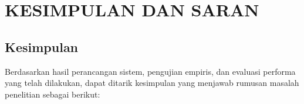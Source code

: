 \chapter{KESIMPULAN DAN SARAN}

\section{Kesimpulan}
\label{sec:conclusion}

Berdasarkan hasil perancangan sistem, pengujian empiris, dan evaluasi performa yang telah dilakukan, dapat ditarik kesimpulan yang menjawab rumusan masalah penelitian sebagai berikut:

